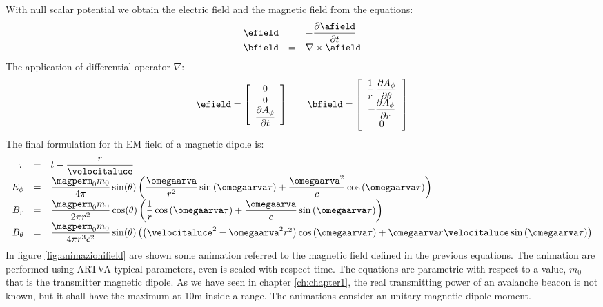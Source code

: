 With null scalar potential we obtain the electric field and the magnetic field from the equations:
\begin{equation}
\begin{array}{rcl}
\efield & = & - \partialtarg{\afield} \\
\bfield & = & \nabla\times\afield 
\end{array}
\end{equation}
The application of differential operator $\nabla$:
\begin{equation}
\efield = \left[ \begin{array}{c} 0 \\ 0 \\ \partialtarg{A_{\phi}} \end{array} \right]
\qquad
\bfield = \left[ \begin{array}{c} \dfrac{1}{r}\;\dfrac{\partial A_{\phi}}{\partial \theta} \\ - \dfrac{\partial A_{\phi}}{\partial r} \\ 0 \end{array} \right]
\end{equation}
The final formulation for th EM field of a magnetic dipole is:
\begin{equation}
\begin{array}{rcl}
\label{eq:campidef1}
\tau & = &  t - \dfrac{r}{\velocitaluce} \\
E_{\phi} & = & \dfrac{\magperm_0 m_0}{4\pi}\sin(\theta)\left( \dfrac{\omegaarva}{r^2}\sin\left( \omegaarva\tau \right) + \dfrac{\omegaarva^2}{c}\cos\left( \omegaarva\tau \right) \right) \\
B_{r} & = & \dfrac{\magperm_0 m_0}{2\pi r^2}\cos(\theta)\left( \dfrac{1}{r}\cos\left( \omegaarva\tau \right) + \dfrac{\omegaarva}{c}\sin\left( \omegaarva\tau \right) \right) \\
B_{\theta} & = & \dfrac{\magperm_0 m_0}{4 \pi r^3 c^2}\sin(\theta)\left( \left( \velocitaluce^2 - \omegaarva^2 r^2 \right)\cos\left( \omegaarva\tau \right) + \omegaarva r \velocitaluce \sin\left( \omegaarva\tau \right) \right) 
\end{array}
\end{equation}
In figure \ref{fig:animazionifield} are shown some animation referred to the magnetic field defined in the previous equations. The animation are performed using ARTVA typical parameters, even is scaled with respect time. The equations are parametric with respect to a value, $m_0$ that is the transmitter magnetic dipole. As we have seen in chapter \ref{ch:chapter1}, the real transmitting power of an avalanche beacon is not known, but it shall have the maximum at \num{10}\si{\meter} inside a range. The animations consider an unitary magnetic dipole moment.

